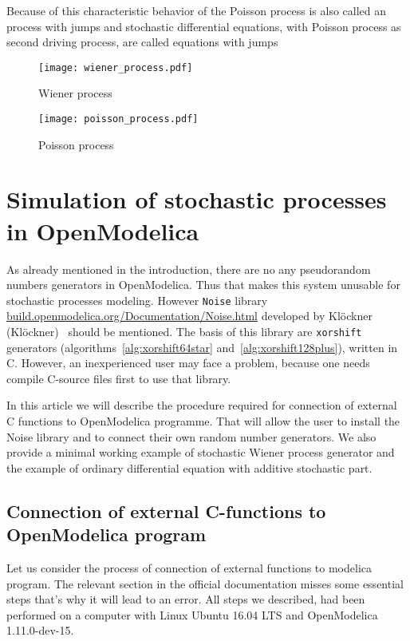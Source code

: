 \documentclass[%
floatfix,
showkeys,
nofootinbib, %
superscriptaddress, %
]{revtex4-1}
\begin{document}
Because of this characteristic behavior of the Poisson process is also
called an process with jumps and stochastic differential equations,
with Poisson process as second driving process, are called equations
with jumps~\cite{L_Platen_Bruti}

\begin{figure}
  \centering
  \begin{minipage}[b]{0.48\linewidth}
    \texttt{[image: wiener\_process.pdf]}
    \caption{Wiener process}
    \label{fig:wienerprocess}
  \end{minipage}
  \hfill
  \begin{minipage}[b]{0.48\linewidth}
    \texttt{[image: poisson\_process.pdf]}
    \caption{Poisson process}
    \label{fig:poissonprocess}
  \end{minipage}
\end{figure}


\section{Simulation of stochastic processes in OpenModelica}

As already mentioned in the introduction, there are no any
pseudorandom numbers generators in OpenModelica. Thus that makes this
system unusable for stochastic processes modeling. However
\texttt{Noise} library
\url{build.openmodelica.org/Documentation/Noise.html} developed by
Klöckner (Klöckner)~\cite{L_Klockner:2014} should be mentioned. The
basis of this library are \texttt{xorshift} generators
(algorithms~\ref{alg:xorshift64star} and~\ref{alg:xorshift128plus}),
written in C. However, an inexperienced user may face a problem,
because one needs compile C-source files first to use that library.

In this article we will describe the procedure required for connection
of external C functions to OpenModelica programme. That will allow the
user to install the Noise library and to connect their own random
number generators. We also provide a minimal working example of
stochastic Wiener process generator and the example of ordinary
differential equation with additive stochastic part.

\subsection{Connection of external C-functions to OpenModelica program}

Let us consider the process of connection of external functions to
modelica program. The relevant section in the official documentation
misses some essential steps that's why it will lead to an error. All
steps we described, had been performed on a computer with Linux Ubuntu
16.04 LTS and OpenModelica 1.11.0-dev-15.
\end{document}
